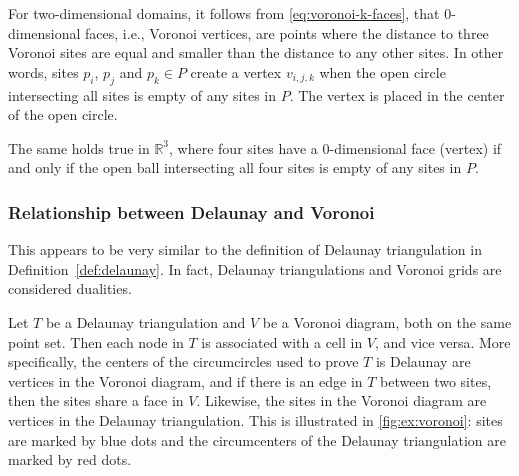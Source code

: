 For two-dimensional domains, it follows from \autoref{eq:voronoi-k-faces}, that 0-dimensional faces, i.e., Voronoi vertices, are points where the distance to three Voronoi sites are equal and smaller than the distance to any other sites. In other words, sites $p_i$, $p_j$ and $p_k \in P$ create a vertex $v_{i, j, k}$ when the open circle intersecting all sites is empty of any sites in $P$. The vertex is placed in the center of the open circle.

The same holds true in $\mathbb{R}^3$, where four sites have a 0-dimensional face (vertex) if and only if the open ball intersecting all four sites is empty of any sites in $P$.

\subsubsection{Relationship between Delaunay and Voronoi}
This appears to be very similar to the definition of Delaunay triangulation in Definition~\ref{def:delaunay}. In fact, Delaunay triangulations and Voronoi grids are considered dualities.


Let $T$ be a Delaunay triangulation and $V$ be a Voronoi diagram, both on the same point set. Then each node in $T$ is associated with a cell in $V$, and vice versa. More specifically, the centers of the circumcircles used to prove $T$ is Delaunay are vertices in the Voronoi diagram, and if there is an edge in $T$ between two sites, then the sites share a face in $V$. Likewise, the sites in the Voronoi diagram are vertices in the Delaunay triangulation. This is illustrated in \autoref{fig:ex:voronoi}: sites are marked by blue dots and the circumcenters of the Delaunay triangulation are marked by red dots.


